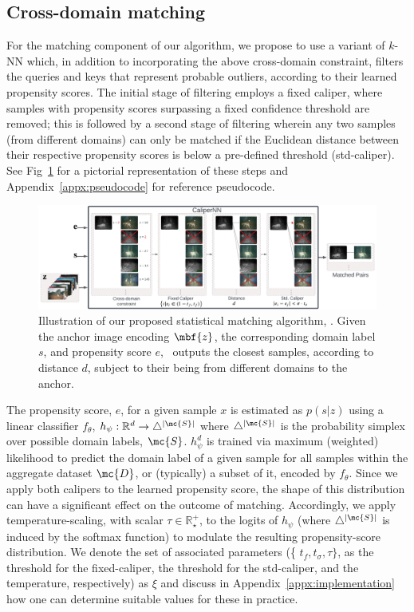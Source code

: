 \subsection{Cross-domain matching}\label{subsec:matching}

For the matching component of our algorithm, we propose to use a variant of $k$-NN which, in
addition to incorporating the above cross-domain constraint, filters the queries and keys that
represent probable outliers, according to their learned propensity scores.
%
The initial stage of filtering employs a fixed caliper, where samples with propensity scores
surpassing a fixed confidence threshold are removed; this is followed by a second stage of
filtering wherein any two samples (from different domains) can only be matched if the Euclidean
distance between their respective propensity scores is below a pre-defined threshold (std-caliper).
%
See Fig~\ref{fig:calipernn_pipeline} for a pictorial representation of these steps and
Appendix~\ref{appx:pseudocode} for reference pseudocode.

\begin{figure}[tbp]
  \centering
  \includegraphics[width=1.\textwidth]{figures/CaliperNN_PS_pipeline.pdf}
  \caption{
 Illustration of our proposed statistical matching algorithm, \CNN. Given the anchor image
 encoding $\mbf{z}$, the corresponding domain label $s$, and propensity score $e$, \CNN~outputs the
 closest samples, according to distance $d$, subject to their being from different domains to the
 anchor.
}
  \label{fig:calipernn_pipeline}
\end{figure}

%
The propensity score, $e$, for a given sample $x$ is estimated as $p(s|z)$ using a linear
classifier $f_\theta$, $h_\psi: \mathbb{R}^d \rightarrow \bigtriangleup^{|\mc{S}|}$ where
$\bigtriangleup^{|\mc{S}|}$ is the probability simplex over possible domain labels, $\mc{S}$.
$h_\psi^d$ is trained via maximum (weighted) likelihood to predict the domain label of a given
sample for all samples within the aggregate dataset $\mc{D}$, or (typically) a subset of it,
encoded by $f_\theta$.
%
Since we apply both calipers to the learned propensity score, the shape of this distribution can
have a significant effect on the outcome of matching.
%
Accordingly, we apply temperature-scaling, with scalar $\tau \in \mathbb{R}^+_\star$, to the logits
of $h_\psi$ (where $\bigtriangleup^{|\mc{S}|}$ is induced by the softmax function) to modulate the
resulting propensity-score distribution.
%
We denote the set of associated parameters (\{ $t_{f}, t_{\sigma}, \tau \}$, as the threshold for
the fixed-caliper, the threshold for the std-caliper, and the temperature, respectively) as $\xi$
and discuss in Appendix~\ref{appx:implementation} how one can determine suitable values for these in practice.

